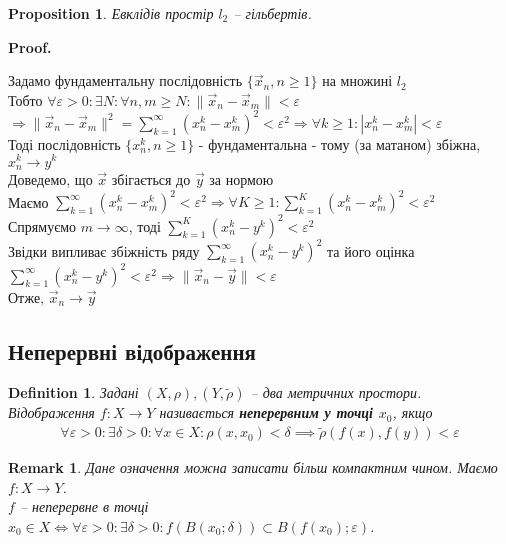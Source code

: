 \documentclass[a4paper, 10pt]{article}
\makeatletter
\theoremstyle{theoremdd}
\theoremstyle{theoremdd}
\newtheorem{definition}[theorem]{Definition}
\theoremstyle{theoremdd}
\theoremstyle{theoremdd}
\theoremstyle{theoremdd}
\newtheorem{proposition}[theorem]{Proposition}
\theoremstyle{theoremdd}
\newtheorem{remark}[theorem]{Remark}
\theoremstyle{theoremdd}
\theoremstyle{theoremdd}
\renewenvironment{proof}[1][Proof.\\]{\par
\pushQED{\hfill \qed}%
\normalfont \topsep6\p@\@plus6\p@\relax
\trivlist
\item\relax
{\bfseries
#1\@addpunct{.}}\hspace\labelsep\ignorespaces
}{%
\popQED\endtrivlist\@endpefalse
}
\makeatother
\begin{document}
\begin{proposition}
Евклідів простір $l_2$ -- гільбертів.
\end{proposition}

\begin{proof}
Задамо фундаментальну послідовність $\{\vec{x}_n, n \geq 1\}$ на множині $l_2$\\
Тобто $\forall \varepsilon > 0: \exists N: \forall n, m \geq N: \|\vec{x}_n - \vec{x}_m\| < \varepsilon$\\
$\Rightarrow \|\vec{x}_n - \vec{x}_m\|^2 = \displaystyle\sum_{k=1}^\infty (x_n^k - x_m^k)^2 < \varepsilon^2 \Rightarrow \forall k \geq 1: |x_n^k - x_m^k| < \varepsilon$\\
Тоді послідовність $\{x_n^k, n \geq 1\}$ - фундаментальна - тому (за матаном) збіжна, $x_n^k \to y^k$\\
Доведемо, що $\vec{x}$ збігається до $\vec{y}$ за нормою\\
Маємо $\displaystyle\sum_{k=1}^\infty (x_n^k - x_m^k)^2 < \varepsilon^2 \Rightarrow \forall K \geq 1: \displaystyle\sum_{k=1}^K (x_n^k - x_m^k)^2 < \varepsilon^2$\\
Спрямуємо $m \to \infty$, тоді $\displaystyle\sum_{k=1}^K (x_n^k - y^k)^2 < \varepsilon^2$\\
Звідки випливає збіжність ряду $\displaystyle\sum_{k=1}^\infty (x_n^k - y^k)^2$ та його оцінка\\
$\displaystyle\sum_{k=1}^\infty (x_n^k - y^k)^2 < \varepsilon^2 \Rightarrow \|\vec{x}_n - \vec{y}\| < \varepsilon$\\
Отже, $\vec{x}_n \to \vec{y}$
\end{proof}

\subsection{Неперервні відображення}
\begin{definition}
Задані $(X,\rho), (Y,\tilde{\rho})$ -- два метричних простори.\\
Відображення $f \colon X \to Y$ називається \textbf{неперервним у точці $x_0$}, якщо
\begin{align*}
\forall \varepsilon > 0: \exists \delta > 0: \forall x \in X: \rho(x,x_0) < \delta \implies \tilde{\rho}(f(x),f(y)) < \varepsilon
\end{align*}
\end{definition}

\begin{remark}
Дане означення можна записати більш компактним чином. Маємо $f \colon X \to Y$.\\
$f$ -- неперервне в точці $x_0 \in X \iff \forall \varepsilon > 0: \exists \delta > 0: f(B(x_0;\delta)) \subset B(f(x_0);\varepsilon)$.
\end{remark}
\end{document}
